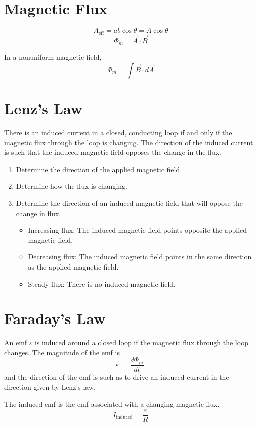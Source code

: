 \documentclass{article}
\begin{document}
\section*{Magnetic Flux}
\[A_\text{eff}=ab\cos\theta = A \cos\theta\]
\[\Phi_m = \vec{A}\cdot\vec{B}\]

In a nonuniform magnetic field,
\[\Phi_m = \int \vec{B}\cdot d \vec{A}\]

\section*{Lenz's Law}
There is an induced current in a closed, conducting loop if and only if the magnetic flux through
the loop is changing. The direction of the induced current is such that the induced magnetic field
opposes the change in the flux.

\begin{enumerate}
    \item Determine the direction of the applied magnetic field.
    \item Determine how the flux is changing.
    \item Determine the direction of an induced magnetic field that will oppose the change in flux.
    \begin{itemize}
        \item Increasing flux: The induced magnetic field points opposite the applied magnetic
        field.
        \item Decreasing flux: The induced magnetic field points in the same direction as the
        applied magnetic field.
        \item Steady flux: There is no induced magnetic field.
    \end{itemize}
\end{enumerate}

\section*{Faraday's Law}
An emf $\varepsilon$ is induced around a closed loop if the magnetic flux through the loop changes.
The magnitude of the emf is
\[\varepsilon=\Big|\frac{d\Phi_m}{dt}\Big|\]
and the direction of the emf is such as to drive an induced current in the direction given by
Lenz's law.

\vspace{1em}
The induced emf is the emf associated with a changing magnetic flux.
\[I_\text{induced} = \frac{\varepsilon}{R}\]
\end{document}
